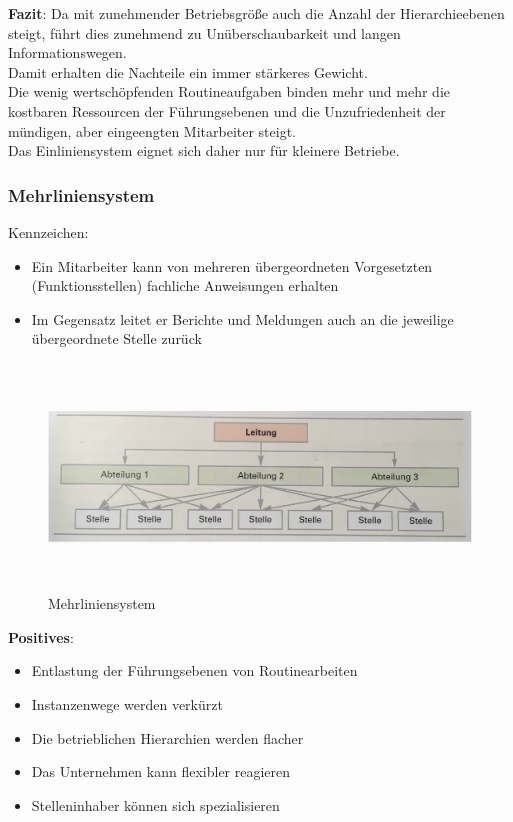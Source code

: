 \documentclass[10pt]{article}
\begin{document}
\textbf{Fazit}:
Da mit zunehmender Betriebsgröße auch die Anzahl der Hierarchieebenen steigt, führt dies zunehmend zu Unüberschaubarkeit und langen Informationswegen. \\
Damit erhalten die Nachteile ein immer stärkeres Gewicht. \\
Die wenig wertschöpfenden Routineaufgaben binden mehr und mehr die kostbaren Ressourcen der Führungsebenen und die Unzufriedenheit der mündigen, aber eingeengten Mitarbeiter steigt. \\
Das Einliniensystem eignet sich daher nur für kleinere Betriebe.

\subsubsection{Mehrliniensystem}
Kennzeichen:
\begin{itemize}
\item Ein Mitarbeiter kann von mehreren übergeordneten Vorgesetzten (Funktionsstellen) fachliche Anweisungen erhalten
\item Im Gegensatz leitet er Berichte und Meldungen auch an die jeweilige übergeordnete Stelle zurück
\end{itemize}
\begin{figure}[H]
\begin{center}
  \includegraphics[height=6cm]{mehrlinien.png}
  \end{center}
  \caption{Mehrliniensystem}
  \label{fig:Mehrliniensystemm}
\end{figure}
\textbf{Positives}:
\begin{itemize}
\item Entlastung der Führungsebenen von Routinearbeiten 
\item Instanzenwege werden verkürzt
\item Die betrieblichen Hierarchien werden flacher
\item Das Unternehmen kann flexibler reagieren
\item Stelleninhaber können sich spezialisieren
\end{itemize}
\end{document}
